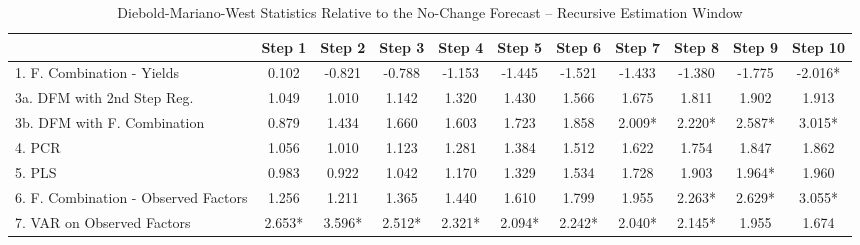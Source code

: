 \documentclass[11pt]{article}
\begin{document}
\begin{table}
\caption{Diebold-Mariano-West Statistics Relative to the No-Change Forecast -- Recursive Estimation Window}     
\center                                                                                                     
\begin{tabular}{|l|c|c|c|c|c|c|c|c|c|c|}                                                                    
\hline                                                                                                      
&Step 1 &Step 2 &Step 3 &Step 4 &Step 5 &Step 6 &Step 7 &Step 8 &Step 9 &Step 10\\                          
\hline                                                                                                      
1. F. Combination - Yields          &0.102&-0.821&-0.788&-1.153&-1.445&-1.521&-1.433&-1.380&-1.775&-2.016*\\
3a. DFM with 2nd Step Reg.          &1.049&1.010&1.142&1.320&1.430&1.566&1.675&1.811&1.902&1.913\\          
3b. DFM with F. Combination         &0.879&1.434&1.660&1.603&1.723&1.858&2.009*&2.220*&2.587*&3.015*\\      
4. PCR                              &1.056&1.010&1.123&1.281&1.384&1.512&1.622&1.754&1.847&1.862\\          
5. PLS                              &0.983&0.922&1.042&1.170&1.329&1.534&1.728&1.903&1.964*&1.960\\         
6. F. Combination - Observed Factors&1.256&1.211&1.365&1.440&1.610&1.799&1.955&2.263*&2.629*&3.055*\\       
7. VAR on Observed Factors          &2.653*&3.596*&2.512*&2.321*&2.094*&2.242*&2.040*&2.145*&1.955&1.674\\  
\hline                                                                                                      
\end{tabular}                                                                                               
\end{table}               
                                                                                   
\end{document}
